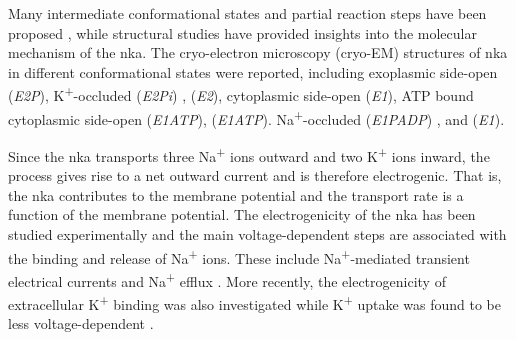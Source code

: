 \documentclass{biophys-new}
\begin{document}
Many intermediate conformational states and partial reaction steps have been proposed \cite{post_flexibility_1969,karlish_conformational_1978,glynn_na_1985, apell_electrogenic_1989,terkildsen_balance_2007},
while structural studies have provided insights into the molecular mechanism of the \Gls{nka}.
The cryo-electron microscopy (cryo-EM) structures of \Gls{nka} in different conformational states were reported,
including exoplasmic side-open (\textit{E2\textperiodcentered P})\cite{kanai_binding_2021,nguyen_structural_2022},
K\textsuperscript{+}-occluded (\textit{E2\textperiodcentered [2K] \textperiodcentered Pi}) \cite{morth_crystal_2007,shinoda_crystal_2009,nguyen_structural_2022},
(\textit{E2\textperiodcentered [2K]})\cite{guo_cryo-em_2022},
cytoplasmic side-open (\textit{E1})\cite{nguyen_structural_2022}, ATP bound cytoplasmic side-open (\textit{E1\textperiodcentered ATP})\cite{nguyen_structural_2022},
(\textit{E1\textperiodcentered [3Na]\textperiodcentered ATP})\cite{guo_cryo-em_2022}.
Na\textsuperscript{+}-occluded (\textit{E1\textperiodcentered [3Na]\textperiodcentered P\text{-}ADP}) \cite{nyblom_crystal_2013,kanai_crystal_2013,nguyen_structural_2022},
and (\textit{E1\textperiodcentered [3Na]})\cite{guo_cryo-em_2022}.

Since the \Gls{nka} transports three Na\textsuperscript{+} ions outward and two K\textsuperscript{+} ions inward,
the process gives rise to a net outward current and is therefore electrogenic\cite{apell_electrogenic_1989,glitsch_electrophysiology_2001}.
That is, the \Gls{nka} contributes to the membrane potential and the transport rate is a function of the membrane potential.
The electrogenicity of the \Gls{nka} has been studied experimentally and the main voltage-dependent steps are associated with the binding and release of Na\textsuperscript{+} ions.
These include Na\textsuperscript{+}-mediated transient electrical currents \cite{nakao_voltage_1986} and Na\textsuperscript{+} efflux \cite{gadsby_extracellular_1993}.
More recently, the electrogenicity of extracellular K\textsuperscript{+} binding was also investigated \cite{peluffo_electrogenic_1997}
while K\textsuperscript{+} uptake was found to be less voltage-dependent \cite{moreno_transient_2020}.
\end{document}
